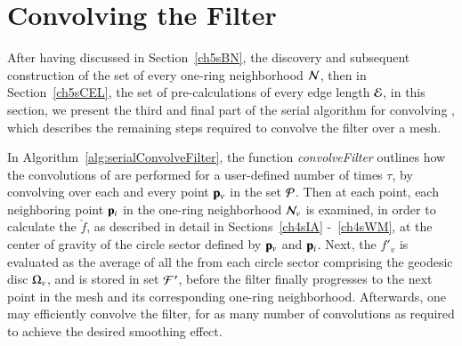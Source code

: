 %
%
%
%
\section{Convolving the Filter}
\label{ch5sCF}
After having discussed in Section~\ref{ch5sBN}, the discovery and subsequent construction of the set of every one-ring neighborhood $\mathcal{N}$, then in Section~\ref{ch5sCEL}, the set of pre-calculations of every edge length $\mathcal{E}$, in this section, we present the third and final part of the serial algorithm for convolving , which describes the remaining steps required to convolve the filter over a mesh. 

In Algorithm~\ref{alg:serialConvolveFilter}, the function \textit{convolveFilter} outlines how the convolutions of  are performed for a user-defined number of times $\tau$, by convolving over each and every point $\mathbf{p}_v$ in the set $\mathcal{P}$. Then at each point, each neighboring point $\mathbf{p}_i$ in the one-ring neighborhood $\mathcal{N}_v$ is examined, in order to calculate the \wmfv{} $\check{f}$, as described in detail in Sections~\ref{ch4sIA} -~\ref{ch4sWM}, at the center of gravity of the circle sector defined by $\mathbf{p}_v$ and $\mathbf{p}_i$. Next, the \wmfv{} $f'_v$ is evaluated as the average of all the  from each circle sector comprising the geodesic disc $\Omega_v$, and is stored  in set $\mathcal{F}'$, before the filter finally progresses to the next point in the mesh and its corresponding one-ring neighborhood.  Afterwards, one may efficiently convolve the filter, for as many number of convolutions as required to achieve the desired smoothing effect.

